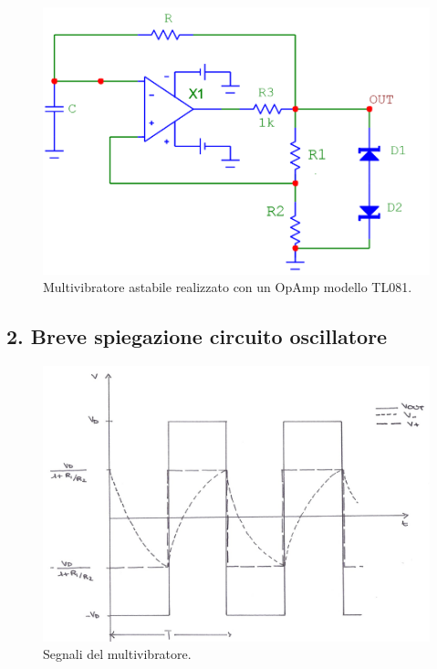 \documentclass[10pt,a4paper]{article}
\begin{document}
\begin{figure}[htb!]
\centering
\includegraphics[scale=0.5]{multivibratoreAstabile.png}
\caption{Multivibratore astabile realizzato con un OpAmp modello TL081.\label{circuito4}}
\end{figure}

\subsection*{2. Breve spiegazione circuito oscillatore}

\begin{figure}[htb!]
\centering
\includegraphics[scale=.5]{immagini/ondeSovrapposte.jpg}
\caption{Segnali del multivibratore.}
\label{funzionamento}
\end{figure}
\end{document}
